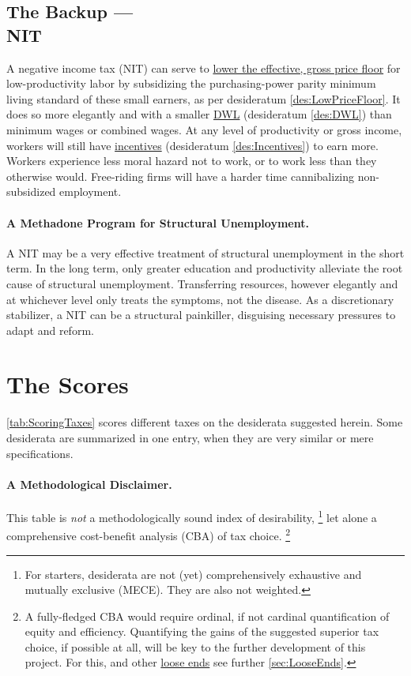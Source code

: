 \subsection[Negative Income Tax]{The Backup ---\\NIT}
	\label{sec:ScoreNIT}
A negative income tax (NIT) can serve to \hyperref[des:LowPriceFloor]{lower the effective, gross price floor} for low-productivity labor by subsidizing the purchasing-power parity minimum living standard of these small earners, as per desideratum \ref{des:LowPriceFloor}.
It does so more elegantly and with a smaller \hyperref[des:DWL]{DWL} (desideratum \ref{des:DWL}) than minimum wages or combined wages.
At any level of productivity or gross income, workers will still have \hyperref[des:Incentives]{incentives} (desideratum \ref{des:Incentives}) to earn more.
Workers experience less moral hazard not to work, or to work less than they otherwise would.
Free-riding firms will have a harder time cannibalizing non-subsidized employment.

\paragraph{A Methadone Program for Structural Unemployment.}
A NIT may be a very effective treatment of structural unemployment in the short term.
In the long term, only greater education and productivity alleviate the root cause of structural unemployment.
Transferring resources, however elegantly and at whichever level only treats the symptoms, not the disease.
As a discretionary stabilizer, a NIT can be a structural painkiller, disguising necessary pressures to adapt and reform.
\clearpage

\section{The Scores}
	\label{sec:Scores}

\autoref{tab:ScoringTaxes} scores different taxes on the desiderata suggested herein.
Some desiderata are summarized in one entry, when they are very similar or mere specifications.

\paragraph{A Methodological Disclaimer.}
This table is \emph{not} a methodologically sound index of desirability,
\footnote{
	For starters, desiderata are not (yet) comprehensively exhaustive and mutually exclusive (MECE).
	They are also not weighted.
}
let alone a comprehensive cost-benefit analysis (CBA) of tax choice.
\footnote{
	A fully-fledged CBA would require ordinal, if not cardinal quantification of equity and efficiency.
	Quantifying the gains of the suggested superior tax choice, if possible at all, will be key to the further development of this project.
	For this, and other \hyperref[sec:LooseEnds]{loose ends} see further \autoref{sec:LooseEnds}.
}

